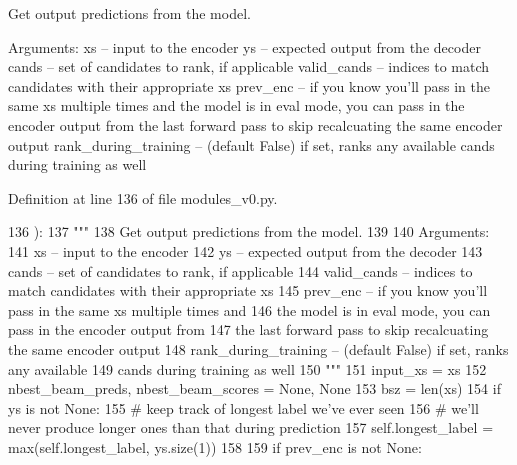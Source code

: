 \begin{DoxyVerb}Get output predictions from the model.

Arguments:
xs -- input to the encoder
ys -- expected output from the decoder
cands -- set of candidates to rank, if applicable
valid_cands -- indices to match candidates with their appropriate xs
prev_enc -- if you know you'll pass in the same xs multiple times and
    the model is in eval mode, you can pass in the encoder output from
    the last forward pass to skip recalcuating the same encoder output
rank_during_training -- (default False) if set, ranks any available
    cands during training as well
\end{DoxyVerb}
 

Definition at line 136 of file modules\+\_\+v0.\+py.


\begin{DoxyCode}
136     ):
137         \textcolor{stringliteral}{"""}
138 \textcolor{stringliteral}{        Get output predictions from the model.}
139 \textcolor{stringliteral}{}
140 \textcolor{stringliteral}{        Arguments:}
141 \textcolor{stringliteral}{        xs -- input to the encoder}
142 \textcolor{stringliteral}{        ys -- expected output from the decoder}
143 \textcolor{stringliteral}{        cands -- set of candidates to rank, if applicable}
144 \textcolor{stringliteral}{        valid\_cands -- indices to match candidates with their appropriate xs}
145 \textcolor{stringliteral}{        prev\_enc -- if you know you'll pass in the same xs multiple times and}
146 \textcolor{stringliteral}{            the model is in eval mode, you can pass in the encoder output from}
147 \textcolor{stringliteral}{            the last forward pass to skip recalcuating the same encoder output}
148 \textcolor{stringliteral}{        rank\_during\_training -- (default False) if set, ranks any available}
149 \textcolor{stringliteral}{            cands during training as well}
150 \textcolor{stringliteral}{        """}
151         input\_xs = xs
152         nbest\_beam\_preds, nbest\_beam\_scores = \textcolor{keywordtype}{None}, \textcolor{keywordtype}{None}
153         bsz = len(xs)
154         \textcolor{keywordflow}{if} ys \textcolor{keywordflow}{is} \textcolor{keywordflow}{not} \textcolor{keywordtype}{None}:
155             \textcolor{comment}{# keep track of longest label we've ever seen}
156             \textcolor{comment}{# we'll never produce longer ones than that during prediction}
157             self.longest\_label = max(self.longest\_label, ys.size(1))
158 
159         \textcolor{keywordflow}{if} prev\_enc \textcolor{keywordflow}{is} \textcolor{keywordflow}{not} \textcolor{keywordtype}{None}:

\end{DoxyCode}
